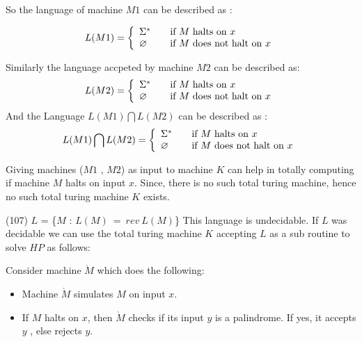 \documentclass[addpoints,12pt]{exam}
\begin{document}
\begin{questions}
\begin{parts}
\begin{itemize}
\end{itemize}
  So the language of machine $M1$ can be described as : 
  
  \[
    L(M1) = \left\{ 
  \begin{array}{l l}
     \Sigma^\ast & \quad \text{if $M$ halts on $x$}\\
     \varnothing & \quad \text{if $M$ does not halt on $x$}\\
  \end{array} \right.
\]

  Similarly the language accpeted by machine $M2$ can be described as:
  \[
    L(M2) = \left\{ 
  \begin{array}{l l}
     \Sigma^\ast & \quad \text{if $M$ halts on $x$}\\
     \varnothing & \quad \text{if $M$ does not halt on $x$}\\
  \end{array} \right.
\]
  And the Language $L(M1)\bigcap L(M2)$ can be described as : 
  \[
   L(M1)\bigcap L(M2)  = \left\{ 
  \begin{array}{l l}
     \Sigma^\ast & \quad \text{if $M$ halts on $x$}\\
     \varnothing & \quad \text{if $M$ does not halt on $x$}\\
  \end{array} \right.
\]
  
  Giving machines ($M1$ , $M2$) as input to machine $K$ can help in totally computing if machine $M$ halts on input $x$. Since, there is no such total turing machine, hence no such total turing machine $K$ exists.
 
\end{parts}

 \question
	(107) \quad $L$ = \{$M$ : $L(M)~=~rev~L(M)$\} \newline	
		This language is undecidable. \newline
		If $L$ was decidable we can use the total turing machine $K$ accepting $L$ as a sub routine to solve $HP$ as follows: 		\newline
		
Consider machine $\grave{M}$ which does the following:
\begin{itemize}
 \item 
  Machine $\grave{M}$ simulates $M$ on input $x$.
  \item
  If $M$ halts on $x$, then $\grave{M}$ checks if its input $y$ is a palindrome. If yes, it accepts $y$ , else rejects $y$.
  

\end{itemize}
\end{questions}
\end{document}
